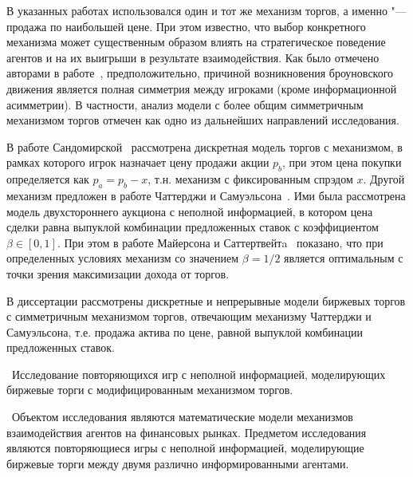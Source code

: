 
В указанных работах использовался один и тот же механизм торгов, а именно "---
продажа по наибольшей цене. При этом известно, что выбор конкретного механизма
может существенным образом влиять на стратегическое поведение агентов и на их
выигрыши в результате взаимодействия. Как было отмечено авторами в
работе~\cite{demeyer02}, предположительно, причиной возникновения броуновского
движения является полная симметрия между игроками (кроме информационной
асимметрии). В частности, анализ модели с более общим симметричным механизмом
торгов отмечен как одно из дальнейших направлений исследования.

В работе Сандомирской~\cite{sandomirskaya14} рассмотрена дискретная модель
торгов с механизмом, в рамках которого игрок назначает цену продажи акции $p_b$,
при этом цена покупки определяется как $p_a = p_b - x$, т.н. механизм с
фиксированным спрэдом $x$. Другой механизм предложен в работе Чаттерджи и
Самуэльсона~\cite{chatterjee83}. Ими была рассмотрена модель двухстороннего
аукциона с неполной информацией, в котором цена сделки равна выпуклой комбинации
предложенных ставок с коэффициентом $\beta \in [0, 1]$. При этом в работе
Майерсона и Саттертвейтa~\cite{myerson83} показано, что при определенных
условиях механизм со значением $\beta = 1/2$ является оптимальным с точки зрения
максимизации дохода от торгов.

{\progress} В диссертации рассмотрены дискретные и непрерывные модели биржевых
торгов с симметричным механизмом торгов, отвечающим механизму Чаттерджи и
Самуэльсона, т.е. продажа актива по цене, равной выпуклой комбинации
предложенных ставок.

\aim\ Исследование повторяющихся игр с неполной информацией, моделирующих
биржевые торги с модифицированным механизмом торгов.

\researchsubject\ Объектом исследования являются математические модели
механизмов взаимодействия агентов на финансовых рынках. Предметом исследования
являются повторяющиеся игры с неполной информацией, моделирующие биржевые торги
между двумя различно информированными агентами.

